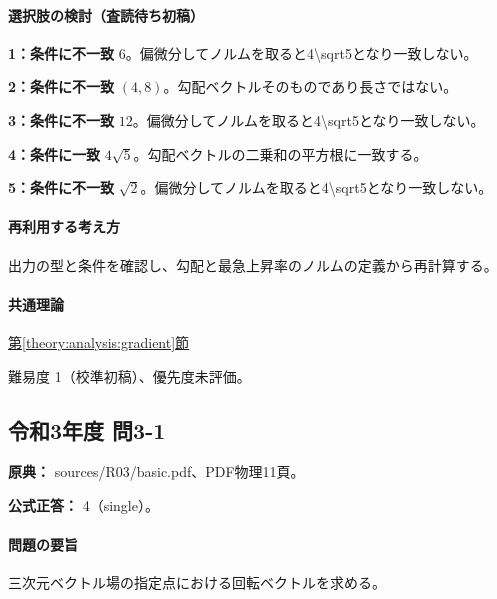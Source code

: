 \paragraph{選択肢の検討（査読待ち初稿）}\mbox{}\par

\noindent\textbf{1：条件に不一致} \(6\)。偏微分してノルムを取ると4\textbackslash{}sqrt5となり一致しない。\par

\noindent\textbf{2：条件に不一致} \((4,8)\)。勾配ベクトルそのものであり長さではない。\par

\noindent\textbf{3：条件に不一致} \(12\)。偏微分してノルムを取ると4\textbackslash{}sqrt5となり一致しない。\par

\noindent\textbf{4：条件に一致} \(4\sqrt5\)。勾配ベクトルの二乗和の平方根に一致する。\par

\noindent\textbf{5：条件に不一致} \(\sqrt2\)。偏微分してノルムを取ると4\textbackslash{}sqrt5となり一致しない。\par

\paragraph{再利用する考え方} 出力の型と条件を確認し、勾配と最急上昇率のノルムの定義から再計算する。

\paragraph{共通理論} \hyperref[theory:analysis:gradient]{第\ref*{theory:analysis:gradient}節}

\par 難易度 1（校準初稿）、優先度未評価。

\subsection{令和3年度 問3-1}
\label{q:r03-reg-basic-3-1}

\noindent\textbf{原典：} sources/R03/basic.pdf、PDF物理11頁。

\textbf{公式正答：} 4（single）。

\paragraph{問題の要旨} 三次元ベクトル場の指定点における回転ベクトルを求める。

